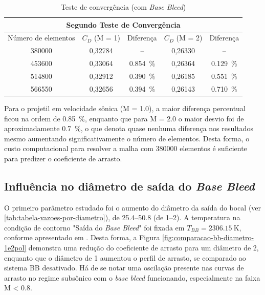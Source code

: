 \begin{table}[ht]
\centering
\caption[Teste de convergência (com \textit{Base Bleed})]{Teste de convergência (com \textit{Base Bleed})}
\vspace{0.5cm}
\begin{tabular}{c|c|c|c|c}
\multicolumn{5}{c}{Segundo Teste de Convergência} \\
\hline 
Número de elementos & \(C_{D}\) (M = \num{1}) & Diferença & \(C_{D}\) (M = \num{2}) & Diferença\\ 
\hline
\num{380000} & 0,32784 & -- & 0,26330 & --\\
\num{453600} & 0,33064 & \qty{0,854}{\percent} & 0,26364 & \qty{0,129}{\percent}\\
\num{514800} & 0,32912 & \qty{0,390}{\percent} & 0,26185 & \qty{0,551}{\percent}\\
\num{566550} & 0,32656 & \qty{0,394}{\percent} & 0,26143 & \qty{0,710}{\percent}\\
\end{tabular}
\label{tab:tabela-malhas-convergencia}
\end{table}

Para o projetil em velocidade sônica (M = \num{1,0}), a maior diferença percentual ficou na ordem de \qty{0,85}{\percent}, enquanto que para M = \num{2,0} o maior desvio foi de aproximadamente \qty{0,7}{\percent}, o que denota quase nenhuma diferença nos resultados mesmo aumentando significativamente o número de elementos. Desta forma, o custo computacional para resolver a malha com \num{380000} elementos é suficiente para predizer o coeficiente de arrasto.

\subsection{Influência no diâmetro de saída do \textit{Base Bleed}} \label{subsec:resultados-com-basebleed-diametros}

O primeiro parâmetro estudado foi o aumento do diâmetro da saída do bocal (ver \autoref{tab:tabela-vazoes-por-diametro}), de \qtyrange{25,4}{50,8}{\millimetre} (de \qtyrange{1}{2}{\polegada}). A temperatura na condição de contorno "Saída do \textit{Base Bleed}"{} foi fixada em \(T_{BB} = \qty{2306,15}{\kelvin}\), conforme apresentado em \cite{Gil2020}. Desta forma, a Figura \ref{fig:comparacao-bb-diametro-1e2pol} demonstra uma redução do coeficiente de arrasto para um diâmetro de \qty{2}{\polegada}, enquanto que o diâmetro de \qty{1}{\polegada} aumentou o perfil de arrasto, se comparado ao sistema BB desativado. Há de se notar uma oscilação presente nas curvas de arrasto no regime subsônico com o \textit{base bleed} funcionando, especialmente na faixa M < \num{0,8}.

